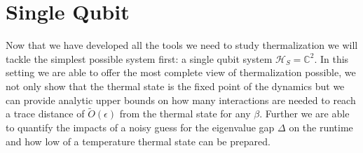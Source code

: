 \documentclass{article}
\newcommand{\hilb}{\mathcal{H}}
\newcommand{\identity}{\mathds{1}}
\begin{document}
\section{Single Qubit} \label{sec:single_qubit}
Now that we have developed all the tools we need to study thermalization we will tackle the simplest possible system first: a single qubit system $\hilb_S = \mathbb{C}^2$. In this setting we are able to offer the most complete view of thermalization possible, we not only show that the thermal state is the fixed point of the dynamics but we can provide analytic upper bounds on how many interactions are needed to reach a trace distance of $\widetilde{O}(\epsilon)$ from the thermal state for any $\beta$. Further we are able to quantify the impacts of a noisy guess for the eigenvalue gap $\Delta$ on the runtime and how low of a temperature thermal state can be prepared. 


\end{document}
